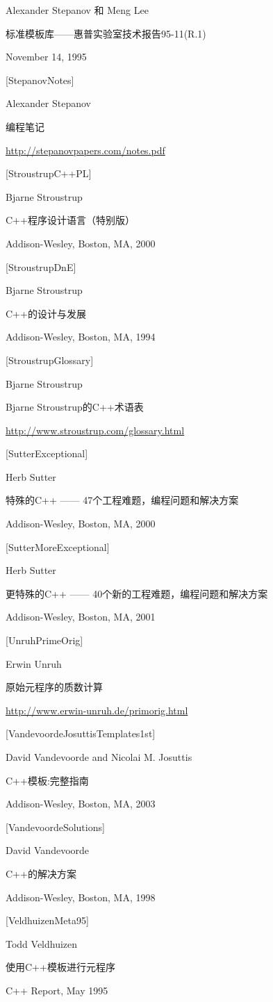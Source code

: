 Alexander Stepanov 和 Meng Lee

标准模板库——惠普实验室技术报告95-11(R.1)

November 14, 1995

{[StepanovNotes]}

Alexander Stepanov

编程笔记

\url{http://stepanovpapers.com/notes.pdf}

{[StroustrupC++PL]}

Bjarne Stroustrup

C++程序设计语言（特别版）

Addison-Wesley, Boston, MA, 2000

{[StroustrupDnE]}

Bjarne Stroustrup

C++的设计与发展

Addison-Wesley, Boston, MA, 1994

{[StroustrupGlossary]}

Bjarne Stroustrup

Bjarne Stroustrup的C++术语表

\url{http://www.stroustrup.com/glossary.html}

{[SutterExceptional]}

Herb Sutter

特殊的C++ —— 47个工程难题，编程问题和解决方案

Addison-Wesley, Boston, MA, 2000

{[SutterMoreExceptional]}

Herb Sutter

更特殊的C++ —— 40个新的工程难题，编程问题和解决方案

Addison-Wesley, Boston, MA, 2001

{[UnruhPrimeOrig]}

Erwin Unruh

原始元程序的质数计算

\url{http://www.erwin-unruh.de/primorig.html}

{[VandevoordeJosuttisTemplates1st]}

David Vandevoorde and Nicolai M. Josuttis

C++模板:完整指南

Addison-Wesley, Boston, MA, 2003

{[VandevoordeSolutions]}

David Vandevoorde

C++的解决方案

Addison-Wesley, Boston, MA, 1998

{[VeldhuizenMeta95]}

Todd Veldhuizen

使用C++模板进行元程序

C++ Report, May 1995























